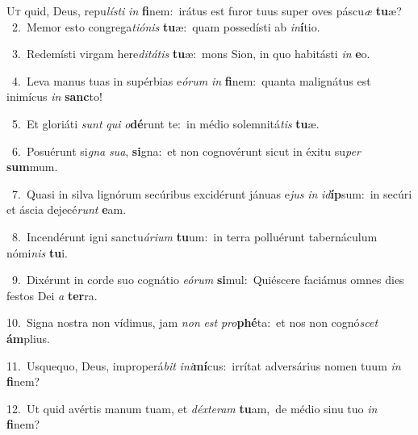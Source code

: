 \lettrine{\initial\textcolor{\initialcolor}{U}}{t} quid, Deus, repu\-\textit{lís}\-\textit{ti} \textit{in} \textbf{fi}\-nem:~\star irátus est furor tuus super oves páscu\textit{æ} \textbf{tu}\-æ?\\
{\numbfont\textcolor{\numbcolor}{~2.}}~Memor esto congrega\-\textit{ti}\-\textit{ó}\textit{nis} \textbf{tu}\-æ:~\star quam possedísti ab \textit{in}\-\textbf{í}tio.\par
{\numbfont\textcolor{\numbcolor}{~3.}}~Redemísti virgam here\-\textit{di}\-\textit{tá}\textit{tis} \textbf{tu}\-æ:~\star mons Sion, in quo habitásti \textit{in} \textbf{e}\-o.\par
{\numbfont\textcolor{\numbcolor}{~4.}}~Leva manus tuas in supérbias e\-\textit{ó}\-\textit{rum} \textit{in} \textbf{fi}\-nem:~\star quanta malignátus est inimícus \textit{in} \textbf{sanc}\-to!\par
{\numbfont\textcolor{\numbcolor}{~5.}}~Et gloriáti \textit{sunt} \textit{qui} \textit{o}\-\textbf{dé}runt te:~\star in médio solemnitá\textit{tis} \textbf{tu}\-æ.\par
{\numbfont\textcolor{\numbcolor}{~6.}}~Posuérunt si\textit{gna} \textit{su}\-\textit{a}, \textbf{si}\-gna:~\star et non cognovérunt sicut in éxitu su\textit{per} \textbf{sum}\-mum.\par
{\numbfont\textcolor{\numbcolor}{~7.}}~Quasi in silva lignórum secúribus excidérunt jánuas e\textit{jus} \textit{in} \textit{id}\-\textbf{íp}sum:~\star in secúri et áscia dejecé\textit{runt} \textbf{e}\-am.\par
{\numbfont\textcolor{\numbcolor}{~8.}}~Incendérunt igni sanctu\-\textit{á}\-\textit{ri}\textit{um} \textbf{tu}\-um:~\star in terra polluérunt tabernáculum nómi\textit{nis} \textbf{tu}\-i.\par
{\numbfont\textcolor{\numbcolor}{~9.}}~Dixérunt in corde suo cognátio \textit{e}\-\textit{ó}\textit{rum} \textbf{si}\-mul:~\star Quiéscere faciámus omnes dies festos Dei \textit{a} \textbf{ter}\-ra.\par
{\numbfont\textcolor{\numbcolor}{10.}}~Signa nostra non vídimus, jam \textit{non} \textit{est} \textit{pro}\-\textbf{phé}ta:~\star et nos non cognó\textit{scet} \textbf{ám}\-plius.\par
{\numbfont\textcolor{\numbcolor}{11.}}~Usquequo, Deus, improperá\textit{bit} \textit{in}\-\textit{i}\textbf{mí}cus:~\star irrítat adversárius nomen tuum \textit{in} \textbf{fi}\-nem?\par
{\numbfont\textcolor{\numbcolor}{12.}}~Ut quid avértis manum tuam, et \textit{déx}\-\textit{te}\textit{ram} \textbf{tu}\-am,~\star de médio sinu tuo \textit{in} \textbf{fi}\-nem?\par
